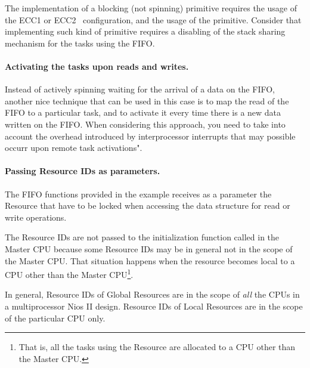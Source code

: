The implementation of a blocking (not spinning) primitive requires the
usage of the ECC1 or ECC2 \ee\ configuration, and the usage of the
 primitive. Consider that implementing such kind of
primitive requires a disabling of the stack sharing mechanism for the
tasks using the FIFO.

\paragraph{Activating the tasks upon reads and writes.}
Instead of actively spinning waiting for the arrival of a data on the
FIFO, another nice technique that can be used in this case is to map
the read of the FIFO to a particular task, and to activate it every
time there is a new data written on the FIFO. When considering this
approach, you need to take into account the overhead introduced by
interprocessor interrupts that may possible occurr upon remote task
activations".

\paragraph{Passing Resource IDs as parameters.}
The FIFO functions provided in the example receives as a parameter the
Resource that have to be locked when accessing the data structure for
read or write operations.

The Resource IDs are not passed to the initialization function called
in the Master CPU because some Resource IDs may be in general not in
the scope of the Master CPU. That situation happens when the resource
becomes local to a CPU other than the Master CPU\footnote{That is, all
the tasks using the Resource are allocated to a CPU other than the
Master CPU.}.

In general, Resource IDs of Global Resources are in the scope of {\em
all} the CPUs in a multiprocessor Nios II design. Resource IDs of
Local Resources are in the scope of the particular CPU only.

